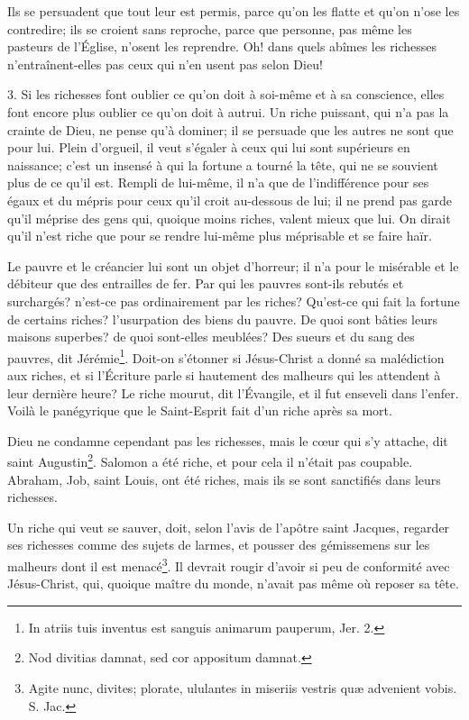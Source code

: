\documentclass[instructions.tex]{subfiles}
\begin{document}
Ils se persuadent que tout leur est permis, parce qu’on les flatte et qu’on n’ose les contredire; ils se croient sans reproche, parce que personne, pas même les pasteurs de l’Église, n’osent les reprendre. Oh! dans quels abîmes les richesses n’entraînent-elles pas ceux qui n’en usent pas selon Dieu!
 
3. Si les richesses font oublier ce qu’on doit à soi-même et à sa conscience, elles font encore plus oublier ce qu’on doit à autrui. Un riche puissant, qui n’a pas la crainte de Dieu, ne pense qu’à dominer; il se persuade que les autres ne sont que pour lui. Plein d’orgueil, il veut s’égaler à ceux qui lui sont supérieurs en naissance; c’est un insensé à qui la fortune a tourné la tête, qui ne se souvient plus de ce qu’il est. Rempli de lui-même, il n’a que de l’indifférence pour ses égaux et du mépris pour ceux qu’il croit au-dessous de lui; il ne prend pas garde qu’il méprise des gens qui, quoique moins riches, valent mieux que lui. On dirait qu’il n’est riche que pour se rendre lui-même plus méprisable et se faire haïr.
 
Le pauvre et le créancier lui sont un objet d’horreur; il n’a pour le misérable et le débiteur que des entrailles de fer. Par qui les pauvres sont-ils rebutés et surchargés? n’est-ce pas ordinairement par les riches? Qu’est-ce qui fait la fortune de certains riches? l’usurpation des biens du pauvre. De quoi sont bâties leurs maisons superbes? de quoi sont-elles meublées? Des sueurs et du sang des pauvres, dit Jérémie\footnote{In atriis tuis inventus est sanguis animarum pauperum, Jer. 2.}. Doit-on s’étonner si Jésus-Christ a donné sa malédiction aux riches, et si l’Écriture parle si hautement des malheurs qui les attendent à leur dernière heure? Le riche mourut, dit l’Évangile, et il fut enseveli dans l’enfer. Voilà le panégyrique que le Saint-Esprit fait d’un riche après sa mort.
 
\secundo Dieu ne condamne cependant pas les richesses, mais le cœur qui s’y attache, dit saint Augustin\footnote{Nod divitias damnat, sed cor appositum damnat.}. Salomon a été riche, et pour cela il n’était pas coupable. Abraham, Job, saint Louis, ont été riches, mais ils se sont sanctifiés dans leurs richesses.
 
Un riche qui veut se sauver, doit, selon l’avis de l’apôtre saint Jacques, regarder ses richesses comme des sujets de larmes, et pousser des gémissemens sur les malheurs dont il est menacé\footnote{Agite nunc, divites; plorate, ululantes in miseriis vestris quæ advenient vobis. S. Jac.}. Il devrait rougir d’avoir si peu de conformité avec Jésus-Christ, qui, quoique maître du monde, n’avait pas même où reposer sa tête.
 
\end{document}

